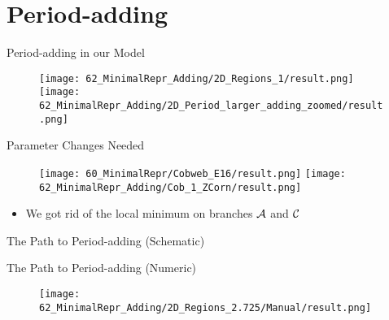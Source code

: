 \section{Period-adding}

\begin{frame}{Period-adding in our Model}
	\begin{figure}
		\texttt{[image: 62\_MinimalRepr\_Adding/2D\_Regions\_1/result.png]}
		\quad
		\texttt{[image: 62\_MinimalRepr\_Adding/2D\_Period\_larger\_adding\_zoomed/result.png]}
	\end{figure}
\end{frame}

\begin{frame}{Parameter Changes Needed}
	\vspace{-1em}
	\begin{figure}
		\texttt{[image: 60\_MinimalRepr/Cobweb\_E16/result.png]}
		\texttt{[image: 62\_MinimalRepr\_Adding/Cob\_1\_ZCorn/result.png]}
	\end{figure}
	\begin{itemize}
		\item We got rid of the local minimum on branches $\mathcal{A}$ and $\mathcal{C}$
	\end{itemize}
\end{frame}

\begin{frame}{The Path to Period-adding (Schematic)}
	\begin{figure}
	\end{figure}
\end{frame}

\begin{frame}{The Path to Period-adding (Numeric)}
	\begin{figure}
		\texttt{[image: 62\_MinimalRepr\_Adding/2D\_Regions\_2.725/Manual/result.png]}
	\end{figure}
\end{frame}

